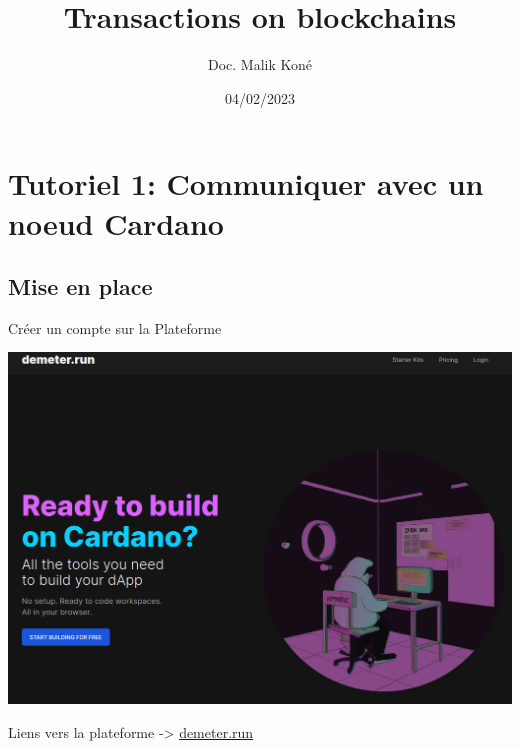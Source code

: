 \documentclass[presentation]{beamer}
\author{Doc. Malik Koné}
\date{04/02/2023}
\title{Transactions on blockchains}
\begin{document}
{
  \frame[plain]{
  }
}

\section{Tutoriel 1: Communiquer avec un noeud Cardano}
\label{sec:org5cf7404}
\subsection{Mise en place}
\label{sec:orgace94cc}
\begin{frame}[label={sec:orgff8e439}]{Créer un compte sur la Plateforme}
      \begin{center}
\includegraphics[height=.7\textheight]{Images/demeter_run.png}
\end{center}
Liens vers la plateforme -> \href{http://demeter.rum}{demeter.run}
\end{frame}
\end{document}
